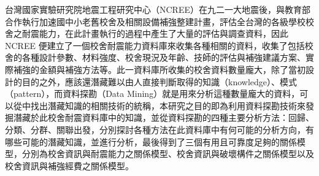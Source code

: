 
台灣國家實驗研究院地震工程研究中心（NCREE）在九二一大地震後，與教育部合作執行加速國中小老舊校舍及相關設備補強整建計畫，評估全台灣的各級學校校舍之耐震能力，在此計畫執行的過程中產生了大量的評估與調查資料，因此 NCREE 便建立了一個校舍耐震能力資料庫來收集各種相關的資料，收集了包括校舍的各種設計參數、材料強度、校舍現況及年齡、技師的評估與補強建議方案、實際補強的金額與補強方法等。此一資料庫所收集的校舍資料數量龐大，除了當初設計的目的之外，應該還潛藏難以由人直接判斷取得的知識（knowledge）、模式（pattern），而資料探勘（Data Mining）就是用來分析這種數量龐大的資料，可以從中找出潛藏知識的相關技術的統稱，本研究之目的即為利用資料探勘技術來發掘潛藏於此校舍耐震資料庫中的知識，並從資料探勘的四種主要分析方法：回歸、分類、分群、關聯出發，分別探討各種方法在此資料庫中有何可能的分析方向，有哪些可能的潛藏知識，並進行分析，最後得到了三個有用且可靠度足夠的關係模型，分別為校舍資訊與耐震能力之關係模型、校舍資訊與破壞構件之關係模型以及校舍資訊與補強經費之關係模型。
	